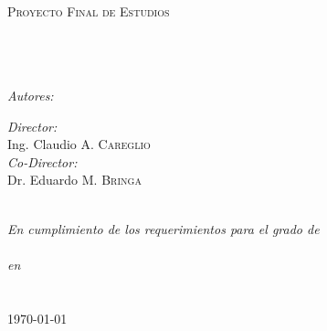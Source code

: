 \documentclass[10pt, twoside]{Thesis} %
\begin{document}
\begin{titlepage}
\begin{center}

\textsc{\LARGE \univname}\\[1.5cm] %
\textsc{\Large Proyecto Final de Estudios}\\[0.5cm] %

\HRule \\[0.4cm] %
{\huge \bfseries \ttitle}\\[0.4cm] %
\HRule \\[1.5cm] %
 
\begin{minipage}{0.4\textwidth}
\begin{flushleft} \large
\emph{Autores:}\\
{\authornames} %
\end{flushleft}
\end{minipage}
\begin{minipage}{0.4\textwidth}
\begin{flushright} \large
\emph{Director:} \\
{Ing. Claudio A. \textsc{Careglio}}\\
\emph{Co-Director:} \\
{Dr. Eduardo M. \textsc{Bringa}}
\end{flushright}
\end{minipage}\\[3cm]
 
\large \textit{En cumplimiento de los requerimientos para el grado de\\\degreename}\\[0.3cm] %
\textit{en}\\[0.4cm]
\facname\\\univname\\[2cm] %
 
{\large \today}\\[4cm] %
 
\vfill
\end{center}

\end{titlepage}

\end{document}
